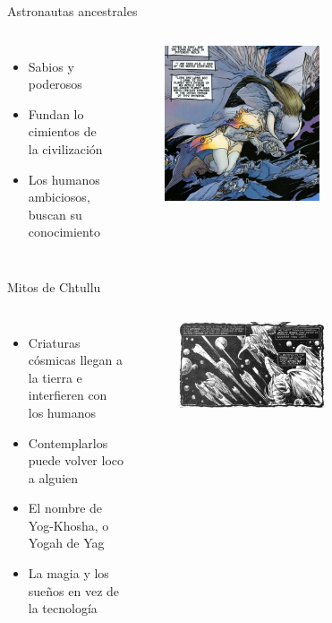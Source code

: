 \begin{frame}{Astronautas ancestrales}
\begin{columns}
 \begin{itemize}
    \item Sabios y poderosos
    \item Fundan lo cimientos de la civilización
    \item Los humanos ambiciosos, buscan su conocimiento
 \end{itemize}
    \begin{figure}[htb]
      \centering
      \includegraphics[width=0.6\textwidth]{img/tropes/astronautas}
    \end{figure}
  \end{columns}
\end{frame}
\note{

}

\begin{frame}{Mitos de Chtullu}
\begin{columns}
 \begin{itemize}
    \item Criaturas cósmicas llegan a la tierra e interfieren con los humanos
    \item Contemplarlos puede volver loco a alguien
    \item El nombre de Yog-Khosha, o Yogah de Yag
    \item La magia y los sueños en vez de la tecnología
 \end{itemize}
    \begin{figure}[htb]
      \centering
      \includegraphics[width=0.6\textwidth]{img/tropes/mitos}
    \end{figure}
  \end{columns}
\end{frame}

